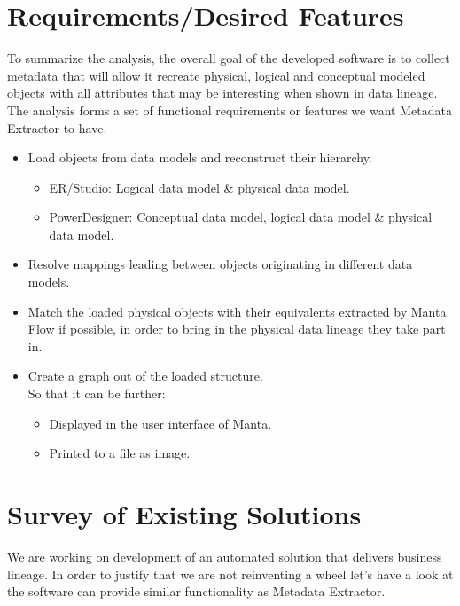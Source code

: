 \section{Requirements/Desired Features}

To summarize the analysis, the overall goal of the developed software is to collect metadata that will allow it recreate physical, logical and conceptual modeled objects with all attributes that may be interesting when shown in data lineage. \\ 

The analysis forms a set of functional requirements or features we want Metadata Extractor to have.

\begin{itemize}
	\item Load objects from data models and reconstruct their hierarchy.
	\begin{itemize}
		\item ER/Studio: Logical data model \& physical data model.
		\item PowerDesigner:  Conceptual data model, logical data model \& physical data model.
	\end{itemize}
	\item Resolve mappings leading between objects originating in different data models.
	\item Match the loaded physical objects with their equivalents extracted by Manta Flow if possible, in order to bring in the physical data lineage they take part in.
	\item Create a graph out of the loaded structure. \\
	So that it can be further:
	\begin{itemize}
		\item Displayed in the user interface of Manta.
		\item Printed to a file as image.
	\end{itemize}
\end{itemize}


\section{Survey of Existing Solutions}

We are working on development of an automated solution that delivers business lineage.
In order to justify that we are not reinventing a wheel let's have a look at the software can provide similar functionality as Metadata Extractor.

